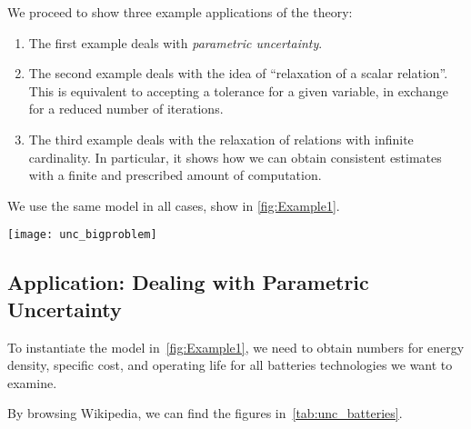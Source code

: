 We proceed to show three example applications of the theory:
\begin{enumerate}
    \item The first example deals with \emph{parametric uncertainty}.
    \item The second example deals with the idea of ``relaxation of a scalar relation''.
          This is equivalent to accepting a tolerance for a given variable, in exchange for a reduced number of iterations.
    \item The third example deals with the relaxation of relations with infinite cardinality.
          In particular, it shows how we can obtain consistent estimates with a finite and prescribed amount of computation.
\end{enumerate}

We use the same model in all cases, show in \cref{fig:Example1}.
\begin{figure*}[b!]
    \centering
    \texttt{[image: unc\_bigproblem]}
    \caption{
        The semantics of the drone design exercises is the minimization of the  and  of the platform, subject to functionality constraints (, , ).
        We discuss how to introduce uncertainty in this framework, which allows, for example, to introduce parametric uncertainty in the definition of components properties (\eg, specific cost of batteries).
    }
    \label{fig:Example1}
\end{figure*}
\vfill\pagebreak

\subsection{Application: Dealing with Parametric Uncertainty\label{sec:Application-uncertainty}}

To instantiate the model in~\cref{fig:Example1}, we need to obtain numbers for energy density, specific cost, and operating life for all batteries technologies we want to examine.

By browsing Wikipedia, we can find the figures in~\cref{tab:unc_batteries}.

